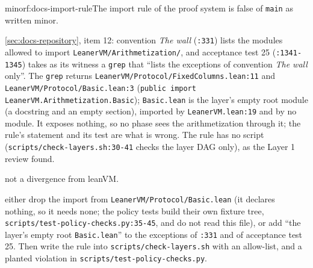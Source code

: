 \begin{finding}{minor}{f:docs-import-rule}{The import rule of the proof system is false of \texttt{main} as written}
 minor.
 \begin{sloppypar}
\cref{sec:docs-repository}, item 12: convention \emph{The wall} (\texttt{:\allowbreak{}331}) lists the modules allowed to import \texttt{Leaner\allowbreak{}VM/\allowbreak{}Arithmetization/\allowbreak{}}, and acceptance test 25 (\texttt{:\allowbreak{}1341-\allowbreak{}1345}) takes as its witness a \texttt{grep} that ``lists the exceptions of convention \emph{The wall} only''. The \texttt{grep} returns \texttt{Leaner\allowbreak{}VM/\allowbreak{}Protocol/\allowbreak{}Fixed\allowbreak{}Columns.\allowbreak{}lean:\allowbreak{}11} and \texttt{Leaner\allowbreak{}VM/\allowbreak{}Protocol/\allowbreak{}Basic.\allowbreak{}lean:\allowbreak{}3} (\texttt{public import Leaner\allowbreak{}VM.\allowbreak{}Arithmetization.\allowbreak{}Basic}); \texttt{Basic.\allowbreak{}lean} is the layer's empty root module (a docstring and an empty section), imported by \texttt{Leaner\allowbreak{}VM.\allowbreak{}lean:\allowbreak{}19} and by no module. It exposes nothing, so no phase sees the arithmetization through it; the rule's statement and its test are what is wrong. The rule has no script (\texttt{scripts/\allowbreak{}check-\allowbreak{}layers.\allowbreak{}sh:\allowbreak{}30-\allowbreak{}41} checks the layer DAG only), as the Layer 1 review found.
\end{sloppypar}
 not a divergence from leanVM.
 \begin{sloppypar}
either drop the import from \texttt{Leaner\allowbreak{}VM/\allowbreak{}Protocol/\allowbreak{}Basic.\allowbreak{}lean} (it declares nothing, so it needs none; the policy tests build their own fixture tree, \texttt{scripts/\allowbreak{}test-\allowbreak{}policy-\allowbreak{}checks.\allowbreak{}py:\allowbreak{}35-\allowbreak{}45}, and do not read this file), or add ``the layer's empty root \texttt{Basic.\allowbreak{}lean}'' to the exceptions of \texttt{:\allowbreak{}331} and of acceptance test 25. Then write the rule into \texttt{scripts/\allowbreak{}check-\allowbreak{}layers.\allowbreak{}sh} with an allow-list, and a planted violation in \texttt{scripts/\allowbreak{}test-\allowbreak{}policy-\allowbreak{}checks.\allowbreak{}py}.
\end{sloppypar}
\end{finding}

